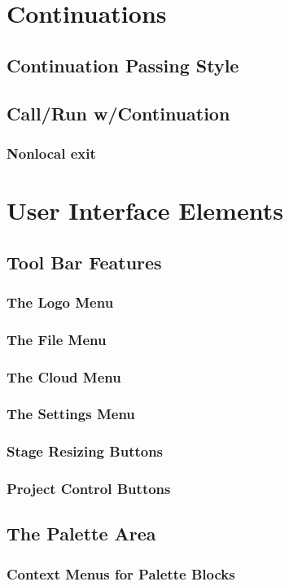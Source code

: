 \documentclass[a4paper]{report}
\begin{document}
\chapter{Continuations}
\section{Continuation Passing Style}
\section{Call/Run w/Continuation}
\subsection{Nonlocal exit}
\chapter{User Interface Elements}
\section{Tool Bar Features}
\subsection{The \Snap{} Logo Menu}
\subsection{The File Menu}
\subsection{The Cloud Menu}
\subsection{The Settings Menu}
\subsection{Stage Resizing Buttons}
\subsection{Project Control Buttons}
\section{The Palette Area}
\subsection{Context Menus for Palette Blocks}
\end{document}
